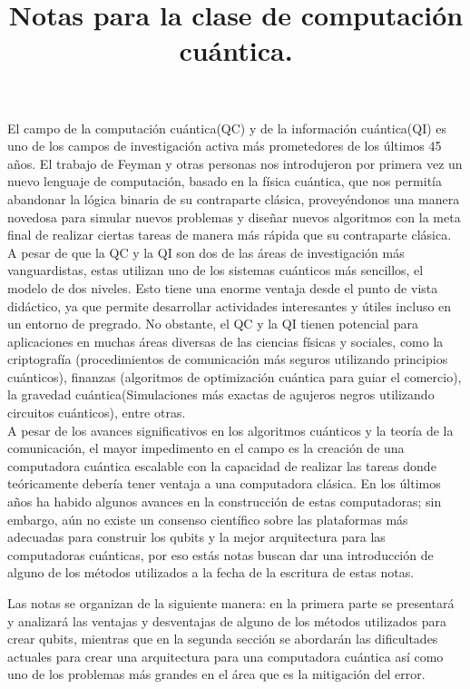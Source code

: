 \documentclass[pdflatex,sn-mathphys-num]{sn-jnl}
\theoremstyle{thmstyleone}%
\theoremstyle{thmstyletwo}%
\theoremstyle{thmstylethree}%
\begin{document}
\title[Article Title]{Notas para la clase de computación cuántica.}

\author*[1,2]{ }


\maketitle

El campo de la computación cuántica(QC) y de la información cuántica(QI) es uno de los campos de investigación activa más prometedores de los últimos 45 años. El trabajo de Feyman y otras personas nos introdujeron por primera vez un nuevo lenguaje de computación, basado en la física cuántica, que nos permitía abandonar la lógica binaria de su contraparte clásica, proveyéndonos una manera novedosa para simular nuevos problemas y diseñar nuevos algoritmos con la meta final de realizar ciertas tareas de manera más rápida que su contraparte clásica.\\

A pesar de que la QC y la QI son dos de las áreas de investigación más vanguardistas, estas utilizan uno de los sistemas cuánticos más sencillos, el modelo de dos niveles. Esto tiene una enorme ventaja desde el punto de vista didáctico, ya que permite desarrollar actividades interesantes y útiles incluso en un entorno de pregrado. No obstante, el QC y la QI tienen potencial para aplicaciones en muchas áreas diversas de las ciencias físicas y sociales, como la criptografía (procedimientos de comunicación más seguros utilizando principios cuánticos), finanzas (algoritmos de optimización cuántica para guiar el comercio), la gravedad cuántica(Simulaciones más exactas de agujeros negros utilizando circuitos cuánticos), entre otras.\\

A pesar de los avances significativos en los algoritmos cuánticos y la teoría de la comunicación, el mayor impedimento en el campo es la creación de una computadora cuántica escalable con la capacidad de realizar las tareas donde teóricamente debería tener ventaja a una computadora clásica. En los últimos años ha habido algunos avances en la construcción de estas computadoras; sin embargo, aún no existe un consenso científico sobre las plataformas más adecuadas para construir los qubits y la mejor arquitectura para las computadoras cuánticas, por eso estás notas buscan dar una introducción de alguno de los métodos utilizados a la fecha de la escritura de estas notas.

Las notas se organizan de la siguiente manera: en la primera parte se presentará y analizará las ventajas y desventajas de alguno de los métodos utilizados para crear qubits, mientras que en la segunda sección se abordarán las dificultades actuales para crear una arquitectura para una computadora cuántica así como uno de los problemas más grandes en el área que es la mitigación del error.




\newpage
\nocite{*}


\end{document}
